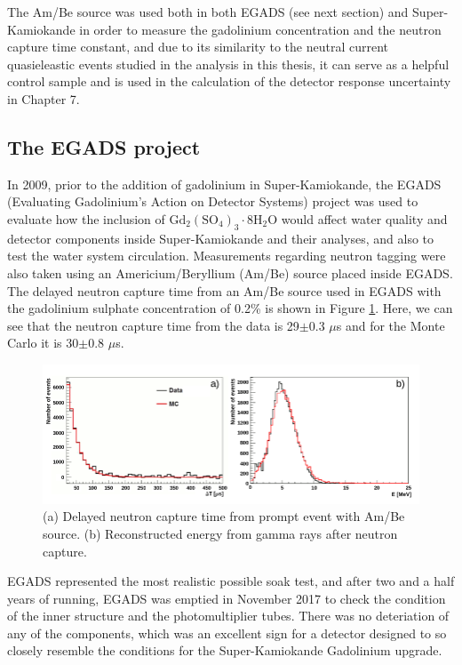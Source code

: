 The Am/Be source was used both in both EGADS (see next section) and Super-Kamiokande in order to measure the gadolinium concentration and the neutron capture time constant, and due to its similarity to the neutral current quasieleastic events studied in the analysis in this thesis, it can serve as a helpful control sample and is used in the calculation of the detector response uncertainty in Chapter 7. 

\subsection{The EGADS project}

In 2009, prior to the addition of gadolinium in Super-Kamiokande, the EGADS (Evaluating Gadolinium's Action on Detector Systems) project was used to evaluate how the inclusion of $\mathrm{Gd}_{2}\left(\mathrm{SO}_{4}\right)_{3} \cdot 8 \mathrm{H}_{2} \mathrm{O}$ would affect water quality and detector components inside Super-Kamiokande and their analyses, and also to test the water system circulation. Measurements regarding neutron tagging were also taken using an Americium/Beryllium (Am/Be) source placed inside EGADS.
The delayed neutron capture time from an Am/Be source used in EGADS with the gadolinium sulphate concentration of 0.2\% is shown in Figure \ref{fig:EGADS_ambe_capture}. Here, we can see that the neutron capture time from the data is 29$\pm$0.3 $\mu$s and for the Monte Carlo it is 30$\pm$0.8 $\mu$s.

\begin{figure}[H]
    \includegraphics[width=\textwidth]{Figures/egads_ambe.png}
\caption{(a) Delayed neutron capture time from prompt event with Am/Be source. (b) Reconstructed energy from gamma rays after neutron capture.}
\label{fig:EGADS_ambe_capture}
\end{figure}


EGADS represented the most realistic possible soak test, and after two and a half years of running, EGADS was emptied in November 2017 to check the condition of the inner structure and the photomultiplier tubes. There was no deteriation of any of the components, which was an excellent sign for a detector designed to so closely resemble the conditions for the Super-Kamiokande Gadolinium upgrade. 

